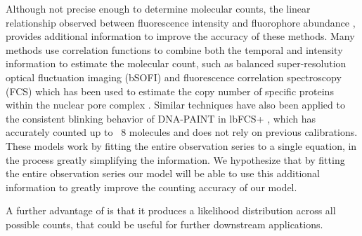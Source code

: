 Although not precise enough to determine molecular counts, the linear
relationship observed between fluorescence intensity and fluorophore abundance
\cite{schmied_fluorescence_2012}, provides additional information to improve the
accuracy of these methods.
%
  Many methods use correlation functions to combine both the temporal and
  intensity information to estimate the molecular count, such as balanced
  super-resolution optical fluctuation imaging (bSOFI) and fluorescence
  correlation spectroscopy (FCS) which has been used to estimate the copy
  number of specific proteins within the nuclear pore complex
  \cite{otsuka_quantitative_2023}. Similar techniques have also been applied to the
  consistent blinking behavior of DNA-PAINT in lbFCS+ \cite{stein_calibration-free_2021}, which has
  accurately counted up to ~8 molecules and does not rely on previous
  calibrations. These models work by fitting the entire observation series to a
  single equation, in the process greatly simplifying the information. We
  hypothesize that by fitting the entire observation series our model will be
  able to use this additional information to greatly improve the counting
  accuracy of our model.

A further advantage of \ours is that it produces a likelihood distribution
across all possible counts, that could be useful for further downstream
applications.

